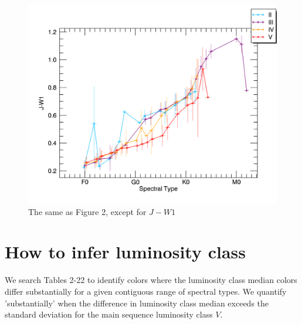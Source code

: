 \begin{figure}[t]
\centering  
\includegraphics[width=1.0\textwidth,clip=true]{Figures/subtype_bar/SPT_J-W1.png}
\caption{The same as Figure 2, except for $J-W1$}
\end{figure}

\section{How to infer luminosity class}

We search Tables 2-22 to identify colors where the luminosity class median colors differ substantially for a given contiguous range of spectral types.  We quantify 'substantially' when the difference in luminosity class median exceeds the standard deviation for the main sequence luminosity class $V$.  







